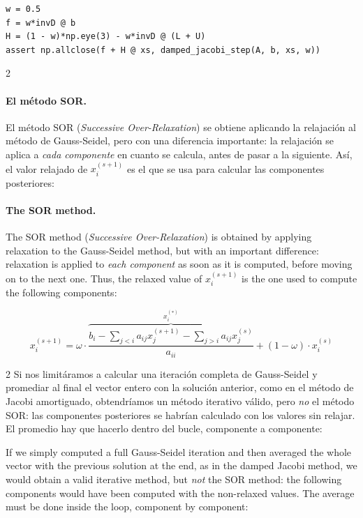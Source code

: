 \begin{verbatim}
w = 0.5
f = w*invD @ b
H = (1 - w)*np.eye(3) - w*invD @ (L + U)
assert np.allclose(f + H @ xs, damped_jacobi_step(A, b, xs, w))
\end{verbatim}

\begin{paracol}{2}
\paragraph{El método SOR.}  El método SOR (\emph{Successive Over-Relaxation}) se obtiene aplicando la relajación al método de Gauss-Seidel, pero con una diferencia importante: la relajación se aplica a \emph{cada componente} en cuanto se calcula, antes de pasar a la siguiente. Así, el valor relajado de $x_i^{(s+1)}$ es el que se usa para calcular las componentes posteriores:
\switchcolumn
\paragraph{The SOR method.}  The SOR method (\emph{Successive Over-Relaxation}) is obtained by applying relaxation to the Gauss-Seidel method, but with an important difference: relaxation is applied to \emph{each component} as soon as it is computed, before moving on to the next one. Thus, the relaxed value of $x_i^{(s+1)}$ is the one used to compute the following components:
\end{paracol}

\begin{equation*}
x_i^{(s+1)}=\omega\cdot \overbrace{\frac{b_i-\sum_{j< i}a_{ij}x_j^{(s+1)}-\sum_{j> i}a_{ij}x_j^{(s)}}{a_{ii}}}^{x_i^{(*)}}+(1-\omega)\cdot x_i^{(s)}
\end{equation*}

\begin{paracol}{2}
Si nos limitáramos a calcular una iteración completa de Gauss-Seidel y promediar al final el vector entero con la solución anterior, como en el método de Jacobi amortiguado, obtendríamos un método iterativo válido, pero \emph{no} el método SOR: las componentes posteriores se habrían calculado con los valores sin relajar. El promedio hay que hacerlo dentro del bucle, componente a componente:

\switchcolumn
If we simply computed a full Gauss-Seidel iteration and then averaged the whole vector with the previous solution at the end, as in the damped Jacobi method, we would obtain a valid iterative method, but \emph{not} the SOR method: the following components would have been computed with the non-relaxed values. The average must be done inside the loop, component by component:
\end{paracol}

